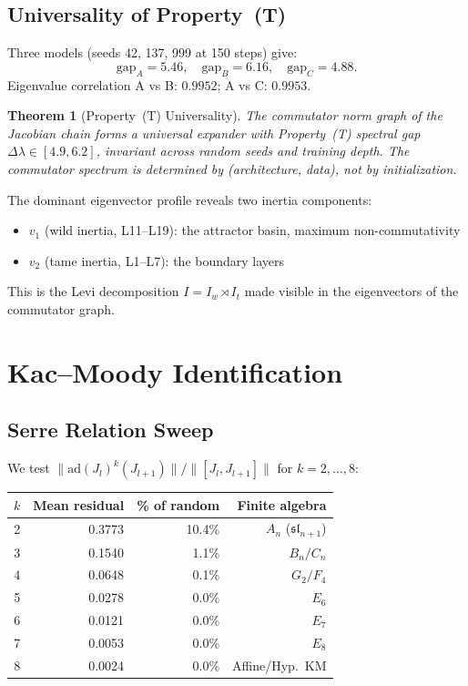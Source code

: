\documentclass[11pt,a4paper]{article}
\newtheorem{theorem}{Theorem}
\begin{document}
\subsection{Universality of Property~(T)}

Three models (seeds 42, 137, 999 at 150 steps) give:
\[
\text{gap}_A = 5.46, \quad \text{gap}_B = 6.16, \quad \text{gap}_C = 4.88.
\]
Eigenvalue correlation A vs B: $0.9952$; A vs C: $0.9953$.

\begin{theorem}[Property~(T) Universality]
The commutator norm graph of the Jacobian chain forms a universal expander
with Property~(T) spectral gap $\Delta\lambda \in [4.9, 6.2]$, invariant
across random seeds and training depth. The commutator spectrum is
determined by (architecture, data), not by initialization.
\end{theorem}

The dominant eigenvector profile reveals two inertia components:
\begin{itemize}
  \item $v_1$ (wild inertia, L11--L19): the attractor basin,
        maximum non-commutativity
  \item $v_2$ (tame inertia, L1--L7): the boundary layers
\end{itemize}

This is the Levi decomposition $I = I_w \rtimes I_t$ made visible in the
eigenvectors of the commutator graph.

\section{Kac--Moody Identification}
\label{sec:kacmoody}

\subsection{Serre Relation Sweep}

We test $\|\text{ad}(J_l)^k(J_{l+1})\| / \|[J_l, J_{l+1}]\|$ for $k = 2,\ldots,8$:

\begin{center}
\begin{tabular}{rrrr}
\toprule
$k$ & Mean residual & \% of random & Finite algebra \\
\midrule
2 & 0.3773 & 10.4\% & $A_n$ ($\mathfrak{sl}_{n+1}$) \\
3 & 0.1540 & 1.1\% & $B_n/C_n$ \\
4 & 0.0648 & 0.1\% & $G_2 / F_4$ \\
5 & 0.0278 & 0.0\% & $E_6$ \\
6 & 0.0121 & 0.0\% & $E_7$ \\
7 & 0.0053 & 0.0\% & $E_8$ \\
8 & 0.0024 & 0.0\% & Affine/Hyp.\ KM \\
\bottomrule
\end{tabular}
\end{center}
\end{document}
